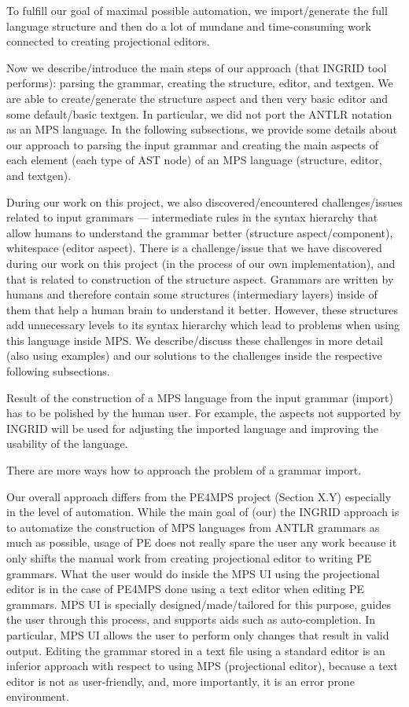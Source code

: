 To fulfill our goal of maximal possible automation, we import/generate the full language structure and then do a lot of mundane and time-consuming work connected to creating projectional editors.

Now we describe/introduce the main steps of our approach (that INGRID tool performs): parsing the grammar, creating the structure, editor, and textgen.
We are able to create/generate the structure aspect and then very basic editor and some default/basic textgen.
In particular, we did not port the ANTLR notation as an MPS language.
In the following subsections, we provide some details about our approach to parsing the input grammar and creating the main aspects of each element (each type of AST node) of an MPS language (structure, editor, and textgen).

During our work on this project, we also discovered/encountered challenges/issues related to input grammars --- intermediate rules in the syntax hierarchy that allow humans to understand the grammar better (structure aspect/component), whitespace (editor aspect).
There is a challenge/issue that we have discovered during our work on this project (in the process of our own implementation), and that is related to construction of the structure aspect.
Grammars are written by humans and therefore contain some structures (intermediary layers) inside of them that help a human brain to understand it better.
However, these structures add unnecessary levels to its syntax hierarchy which lead to problems when using this language inside MPS.
We describe/discuss these challenges in more detail (also using examples) and our solutions to the challenges inside the respective following subsections.

Result of the construction of a MPS language from the input grammar (import) has to be polished by the human user.
For example, the aspects not supported by INGRID will be used for adjusting the imported language and improving the usability of the language.

There are more ways how to approach the problem of a grammar import.

Our overall approach differs from the PE4MPS project (Section X.Y) especially in the level of automation.
While the main goal of (our) the INGRID approach is to automatize the construction of MPS languages from ANTLR grammars as much as possible, usage of PE does not really spare the user any work because it only shifts the manual work from creating projectional editor to writing PE grammars.
What the user would do inside the MPS UI using the projectional editor is in the case of PE4MPS done using a text editor when editing PE grammars.
MPS UI is specially designed/made/tailored for this purpose, guides the user through this process, and supports aids such as auto-completion. In particular, MPS UI allows the user to perform only changes that result in valid output.
Editing the grammar stored in a text file using a standard editor is an inferior approach with respect to using MPS (projectional editor), because a text editor is not as user-friendly, and, more importantly, it is an error prone environment.

